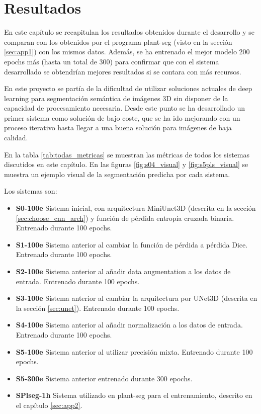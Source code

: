 \chapter{Resultados}\label{pruebas}

En este capítulo se recapitulan los resultados obtenidos durante el desarrollo y se comparan con los obtenidos por el programa plant-seg (visto en la sección \ref{sec:app1}) con los mismos datos. Además, se ha entrenado el mejor modelo 200 epochs más (hasta un total de 300) para confirmar que con el sistema desarrollado se obtendrían mejores resultados si se contara con más recursos.

En este proyecto se partía de la dificultad de utilizar soluciones actuales de deep learning para segmentación semántica de imágenes 3D sin disponer de la capacidad de procesamiento necesaria. Desde este punto se ha desarrollado un primer sistema como solución de bajo coste, que se ha ido mejorando con un proceso iterativo hasta llegar a una buena solución para imágenes de baja calidad.

En la tabla \ref{tab:todas_metricas} se muestran las métricas de todos los sistemas discutidos en este capítulo. En las figuras \ref{fig:s04_visual} y \ref{fig:s5pls_visual} se muestra un ejemplo visual de la segmentación  predicha por cada sistema.

Los sistemas son:
\begin{itemize}
\item \textbf{S0-100e} Sistema inicial, con arquitectura MiniUnet3D (descrita en la sección \ref{sec:choose_cnn_arch}) y función de pérdida entropía cruzada binaria. Entrenado durante 100 epochs.
\item \textbf{S1-100e} Sistema anterior al cambiar la función de pérdida a pérdida Dice. Entrenado durante 100 epochs.
\item \textbf{S2-100e} Sistema anterior al añadir data augmentation a los datos de entrada. Entrenado durante 100 epochs.
\item \textbf{S3-100e} Sistema anterior al cambiar la arquitectura por UNet3D (descrita en la sección \ref{sec:unet}). Entrenado durante 100 epochs.
\item \textbf{S4-100e} Sistema anterior al añadir normalización a los datos de entrada. Entrenado durante 100 epochs.
\item \textbf{S5-100e} Sistema anterior al utilizar precisión mixta. Entrenado durante 100 epochs.
\item \textbf{S5-300e} Sistema anterior entrenado durante 300 epochs.
\item \textbf{SPlseg-1h} Sistema utilizado en plant-seg para el entrenamiento, descrito en el capítulo \ref{sec:app2}.
\end{itemize}


